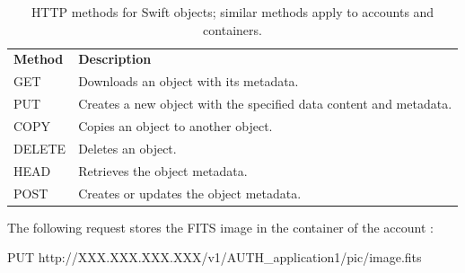 \begin{table}[H]
    \centering
    \setlength{\tabcolsep}{4pt}
    \begin{tcolorbox}[enhanced, colback=gray!5, boxrule=0.8pt, colframe=black, arc=0mm, left=0mm, right=0mm, top=0.6mm, bottom=0.6mm, boxsep=0mm, sharp corners=south]
        \small
    \begin{tabularx}{\textwidth}{
        >{\raggedright\arraybackslash}p{}
        >{\raggedright\arraybackslash}X
    }
        \rowcolor{gray!20}
        \textbf{Method} & \textbf{Description} \\
        \ttfamily\footnotesize GET & Downloads an object with its metadata. \\
        \ttfamily\footnotesize PUT & Creates a new object with the specified data content and metadata. \\
        \ttfamily\footnotesize COPY & Copies an object to another object. \\
        \ttfamily\footnotesize DELETE & Deletes an object. \\
        \ttfamily\footnotesize HEAD & Retrieves the object metadata. \\
        \ttfamily\footnotesize POST & Creates or updates the object metadata. \\
    \end{tabularx}
    \end{tcolorbox}

\vspace{-0.5em}

    \caption{HTTP methods for Swift objects; similar methods apply to accounts and containers.}
    \label{tab:swift-methods}

    \vspace{-1em}
\end{table}

\begin{exampleblock}
    The following request stores the FITS image  in the container  of the account :

    \vspace{-0.3em}

    \begin{codeblock}[language=bash, numbers=none]
PUT http://XXX.XXX.XXX.XXX/v1/AUTH_application1/pic/image.fits
    \end{codeblock}
\end{exampleblock}

